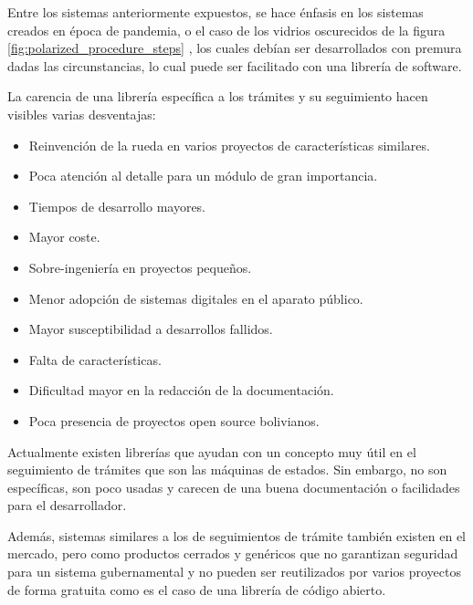 Entre los sistemas anteriormente expuestos, se hace énfasis en los sistemas creados
en época de pandemia, o el caso de los vidrios oscurecidos de la figura
\ref{fig:polarized_procedure_steps} , los cuales debían ser desarrollados con
premura dadas las circunstancias, lo cual puede ser facilitado con una librería de
software.

La carencia de una librería específica a los trámites y su seguimiento hacen visibles
varias desventajas:

\begin{itemize}
	\item Reinvención de la rueda en varios proyectos de características similares.

	\item Poca atención al detalle para un módulo de gran importancia.

	\item Tiempos de desarrollo mayores.

	\item Mayor coste.

	\item Sobre-ingeniería en proyectos pequeños.

	\item Menor adopción de sistemas digitales en el aparato público.

	\item Mayor susceptibilidad a desarrollos fallidos.

	\item Falta de características.

	\item Dificultad mayor en la redacción de la documentación.

	\item Poca presencia de proyectos open source bolivianos.
\end{itemize}

Actualmente existen librerías que ayudan con un concepto muy útil en el
seguimiento de trámites que son las máquinas de estados. Sin embargo, no son
específicas, son poco usadas y carecen de una buena documentación o facilidades para
el desarrollador.

Además, sistemas similares a los de seguimientos de trámite también existen en
el mercado, pero como productos cerrados y genéricos que no garantizan seguridad
para un sistema gubernamental y no pueden ser reutilizados por varios proyectos de
forma gratuita como es el caso de una librería de código abierto.

